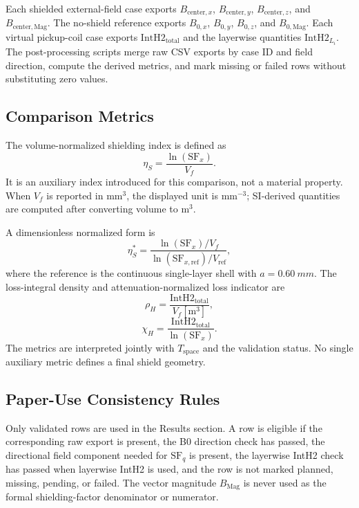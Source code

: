 \documentclass[letterpaper,journal]{IEEEtran}
\begin{document}
Each shielded external-field case exports $B_{\mathrm{center},x}$, $B_{\mathrm{center},y}$, $B_{\mathrm{center},z}$, and $B_{\mathrm{center,Mag}}$. The no-shield reference exports $B_{0,x}$, $B_{0,y}$, $B_{0,z}$, and $B_{0,\mathrm{Mag}}$. Each virtual pickup-coil case exports $\mathrm{IntH2}_{\mathrm{total}}$ and the layerwise quantities $\mathrm{IntH2}_{L_i}$. The post-processing scripts merge raw CSV exports by case ID and field direction, compute the derived metrics, and mark missing or failed rows without substituting zero values.

\subsection{Comparison Metrics}

The volume-normalized shielding index is defined as
\begin{equation}
\eta_S=\frac{\ln(\mathrm{SF}_x)}{V_f}.
\label{eq:etas}
\end{equation}
It is an auxiliary index introduced for this comparison, not a material property. When $V_f$ is reported in $\mathrm{mm^3}$, the displayed unit is $\mathrm{mm^{-3}}$; SI-derived quantities are computed after converting volume to $\mathrm{m^3}$.

A dimensionless normalized form is
\begin{equation}
\eta_S^*=
\frac{\ln(\mathrm{SF}_x)/V_f}{\ln(\mathrm{SF}_{x,\mathrm{ref}})/V_{\mathrm{ref}}},
\label{eq:etasstar}
\end{equation}
where the reference is the continuous single-layer shell with $a=\SI{0.60}{mm}$. The loss-integral density and attenuation-normalized loss indicator are
\begin{equation}
\rho_H=\frac{\mathrm{IntH2}_{\mathrm{total}}}{V_f[\mathrm{m^3}]},
\label{eq:rhoh}
\end{equation}
\begin{equation}
\chi_H=\frac{\mathrm{IntH2}_{\mathrm{total}}}{\ln(\mathrm{SF}_x)}.
\label{eq:chih}
\end{equation}
The metrics are interpreted jointly with $T_{\mathrm{space}}$ and the validation status. No single auxiliary metric defines a final shield geometry.

\subsection{Paper-Use Consistency Rules}

Only validated rows are used in the Results section. A row is eligible if the corresponding raw export is present, the B0 direction check has passed, the directional field component needed for $\mathrm{SF}_q$ is present, the layerwise IntH2 check has passed when layerwise IntH2 is used, and the row is not marked planned, missing, pending, or failed. The vector magnitude $B_{\mathrm{Mag}}$ is never used as the formal shielding-factor denominator or numerator.
\end{document}
